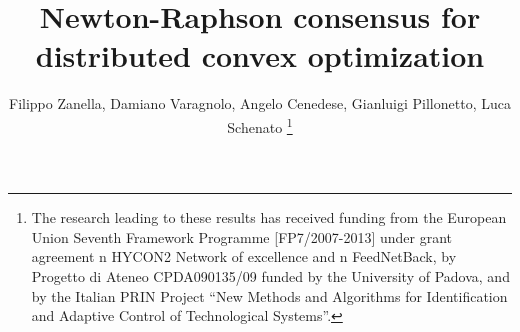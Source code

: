 \def\TITLE			{Newton-Raphson consensus for distributed convex optimization}
\def\SHORTTITLE		{Distributed NR}
\def\AUTHOR			{Filippo Zanella, Damiano Varagnolo, Angelo Cenedese, Gianluigi Pillonetto, Luca Schenato}
\def\INSTITUTE		{Department of Information Engineering}
\def\SHORTINSTITUTE	{DEI - UniPd}
%
\title	{\TITLE}
\author
{
	\AUTHOR
	\thanks
	{
		The research leading to these results has received funding from the European Union Seventh Framework Programme [FP7/2007-2013] under grant agreement n HYCON2 Network of excellence and n FeedNetBack, by Progetto di Ateneo CPDA090135/09 funded by the University of Padova, and by the Italian PRIN Project ``New Methods and Algorithms for Identification and Adaptive Control of Technological Systems''.
	}
}
\date	{}								%


%
% 
